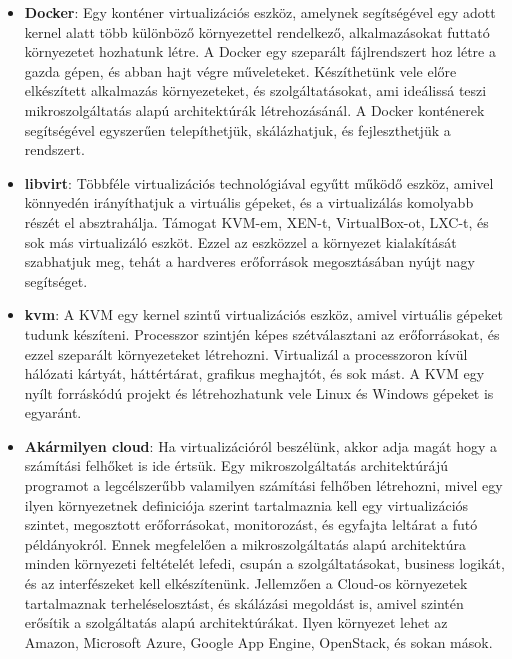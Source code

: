 \documentclass[11pt,magyar,a4paper,twoside,]{report}
\begin{document}
\begin{itemize}
\item
  \textbf{Docker}\citep{docker}: Egy konténer virtualizációs eszköz,
  amelynek segítségével egy adott kernel alatt több különböző
  környezettel rendelkező, alkalmazásokat futtató környezetet hozhatunk
  létre. A Docker egy szeparált fájlrendszert hoz létre a gazda gépen,
  és abban hajt végre műveleteket. Készíthetünk vele előre elkészített
  alkalmazás környezeteket, és szolgáltatásokat, ami ideálissá teszi
  mikroszolgáltatás alapú architektúrák létrehozásánál. A Docker
  konténerek segítségével egyszerűen telepíthetjük, skálázhatjuk, és
  fejleszthetjük a rendszert.
\item
  \textbf{libvirt}\citep{libvirt}: Többféle virtualizációs
  technológiával egyűtt működő eszköz, amivel könnyedén irányíthatjuk a
  virtuális gépeket, és a virtualizálás komolyabb részét el
  absztrahálja. Támogat KVM-em, XEN-t, VirtualBox-ot, LXC-t, és sok más
  virtualizáló eszköt. Ezzel az eszközzel a környezet kialakítását
  szabhatjuk meg, tehát a hardveres erőforrások megosztásában nyújt nagy
  segítséget.
\item
  \textbf{kvm}\citep{kvm}: A KVM egy kernel szintű virtualizációs
  eszköz, amivel virtuális gépeket tudunk készíteni. Processzor szintjén
  képes szétválasztani az erőforrásokat, és ezzel szeparált
  környezeteket létrehozni. Virtualizál a processzoron kívül hálózati
  kártyát, háttértárat, grafikus meghajtót, és sok mást. A KVM egy nyílt
  forráskódú projekt és létrehozhatunk vele Linux és Windows gépeket is
  egyaránt.
\item
  \textbf{Akármilyen cloud}: Ha virtualizációról beszélünk, akkor adja
  magát hogy a számítási felhőket is ide értsük. Egy mikroszolgáltatás
  architektúrájú programot a legcélszerűbb valamilyen számítási felhőben
  létrehozni, mivel egy ilyen környezetnek definiciója szerint
  tartalmaznia kell egy virtualizációs szintet, megosztott
  erőforrásokat, monitorozást, és egyfajta leltárat a futó példányokról.
  Ennek megfelelően a mikroszolgáltatás alapú architektúra minden
  környezeti feltételét lefedi, csupán a szolgáltatásokat, business
  logikát, és az interfészeket kell elkészítenünk. Jellemzően a Cloud-os
  környezetek tartalmaznak terheléselosztást, és skálázási megoldást is,
  amivel szintén erősítik a szolgáltatás alapú architektúrákat. Ilyen
  környezet lehet az Amazon, Microsoft Azure, Google App Engine,
  OpenStack, és sokan mások.
\end{itemize}
\end{document}
